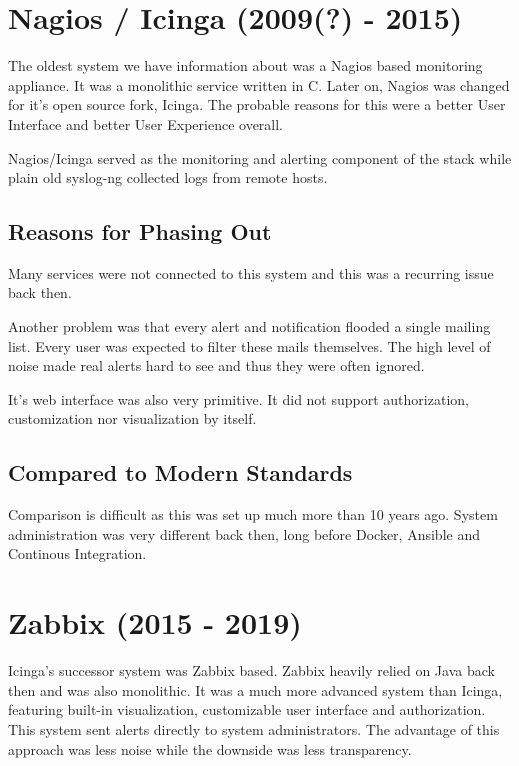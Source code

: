 \section{Nagios / Icinga (2009(?) - 2015)}

The oldest system we have information about was a Nagios based monitoring
appliance. It was a monolithic service written in C. Later on, Nagios was
changed for it's open source fork, Icinga. The probable reasons for this were a
better User Interface and better User Experience overall.

Nagios/Icinga served as the monitoring and alerting component of the stack
while plain old syslog-ng collected logs from remote hosts.

\subsection{Reasons for Phasing Out}

Many services were not connected to this system and this was a recurring issue
back then.

Another problem was that every alert and notification flooded a single mailing
list. Every user was expected to filter these mails themselves.  The high level
of noise made real alerts hard to see and thus they were often ignored.

It's web interface was also very primitive. It did not support authorization,
customization nor visualization by itself.

\subsection{Compared to Modern Standards}

Comparison is difficult as this was set up much more than 10 years ago. System
administration was very different back then, long before Docker, Ansible and
Continous Integration.

\section{Zabbix (2015 - 2019)}

Icinga's successor system was Zabbix based. Zabbix heavily relied on Java back
then and was also monolithic. It was a much more advanced system than Icinga,
featuring built-in visualization, customizable user interface and
authorization. This system sent alerts directly to system administrators. The
advantage of this approach was less noise while the downside was less
transparency.

